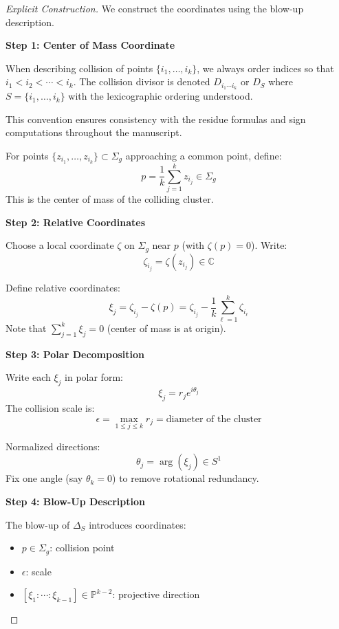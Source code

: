 \begin{proof}[Explicit Construction]
We construct the coordinates using the blow-up description.

\medskip
\noindent\textbf{Step 1: Center of Mass Coordinate}

\begin{remark}\label{rem:collision-ordering}
When describing collision of points $\{i_1, \ldots, i_k\}$, we always order indices so that $i_1 < i_2 < \cdots < i_k$. The collision divisor is denoted $D_{i_1 \cdots i_k}$ or $D_S$ where $S = \{i_1, \ldots, i_k\}$ with the lexicographic ordering understood.

This convention ensures consistency with the residue formulas and sign computations throughout the manuscript.
\end{remark}

For points $\{z_{i_1}, \ldots, z_{i_k}\} \subset \Sigma_g$ approaching a common point, define:
$$p = \frac{1}{k}\sum_{j=1}^k z_{i_j} \in \Sigma_g$$
This is the center of mass of the colliding cluster.

\medskip
\noindent\textbf{Step 2: Relative Coordinates}

Choose a local coordinate $\zeta$ on $\Sigma_g$ near $p$ (with $\zeta(p) = 0$). Write:
$$\zeta_{i_j} = \zeta(z_{i_j}) \in \mathbb{C}$$

Define relative coordinates:
$$\xi_j = \zeta_{i_j} - \zeta(p) = \zeta_{i_j} - \frac{1}{k}\sum_{\ell=1}^k \zeta_{i_\ell}$$
Note that $\sum_{j=1}^k \xi_j = 0$ (center of mass is at origin).

\medskip
\noindent\textbf{Step 3: Polar Decomposition}

Write each $\xi_j$ in polar form:
$$\xi_j = r_j e^{i\theta_j}$$
The collision scale is:
$$\epsilon = \max_{1 \leq j \leq k} r_j = \text{diameter of the cluster}$$

Normalized directions:
$$\theta_j = \arg(\xi_j) \in S^1$$
Fix one angle (say $\theta_k = 0$) to remove rotational redundancy.

\medskip
\noindent\textbf{Step 4: Blow-Up Description}

The blow-up of $\Delta_S$ introduces coordinates:
\begin{itemize}
\item $p \in \Sigma_g$: collision point
\item $\epsilon$: scale
\item $[\xi_1 : \cdots : \xi_{k-1}] \in \mathbb{P}^{k-2}$: projective direction
\end{itemize}


\end{proof}
